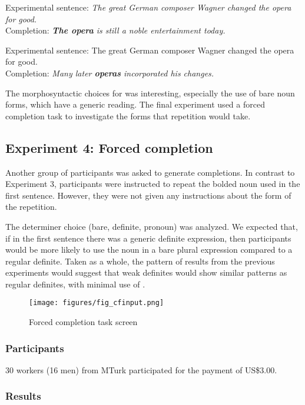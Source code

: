 \documentclass[output=paper,
modfonts
]{langscibook}
\begin{document}
\ea \label{ex:desaetal:15}
{Experimental sentence:} \textit{The great German composer Wagner changed the opera for good.}
\\ {Completion:} \textit{\textbf{The opera} is still a noble entertainment today.}
\z

\ea \label{ex:desaetal:16}
{Experimental sentence:} The great German composer Wagner changed the opera for good.	
\\  {Completion:} \textit{Many later \textbf{operas} incorporated his changes.} 
\z

The morphosyntactic choices for  was interesting, especially the use of bare noun forms, which have a generic reading. The final experiment used a forced completion task to investigate the forms that repetition would take.


\subsection{Experiment 4: Forced completion} 
Another group of participants was asked to generate completions. In contrast to Experiment 3,  participants were instructed to repeat the bolded noun used in the first sentence. However, they were not given any instructions about the form of the repetition. 

The determiner choice (bare, definite, pronoun) was analyzed. We expected that, if in the first sentence there was a generic definite expression, then participants would be more likely to use the noun in a bare plural expression compared to a regular definite. Taken as a whole, the pattern of results from the previous experiments would suggest that weak definites would show similar patterns as regular definites, with minimal use of .

\begin{figure}[H]
\centering
\texttt{[image: figures/fig\_cfinput.png]}
\caption{Forced completion task screen}
\label{fig:desaetal:10}
\end{figure}


\subsubsection{Participants}
30 workers (16 men) from MTurk participated for the payment of US\$3.00. 

\subsubsection{Results}
\end{document}
